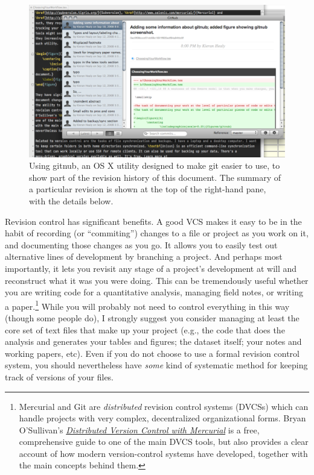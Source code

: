 \documentclass[11pt,article,oneside]{memoir}
\begin{document}
\begin{figure}[h]
	\centering
		\includegraphics[scale=0.33]{figures/gitnub}
	\caption{Using gitnub, an OS X utility designed to make git easier to use, to show part of the revision history of this document. The summary of a particular revision is shown at the top of the right-hand pane, with the details below.}
	\label{fig:gitnub}
\end{figure}

Revision control has significant benefits. A good VCS makes it easy to be in the habit of recording (or ``commiting'') changes to a file or project as you work on it, and documenting those changes as you go. It allows you to easily test out alternative lines of development by branching a project. And perhaps most importantly, it lets you revisit any stage of a project's development at will and reconstruct what it was you were doing. This can be tremendously useful whether you are writing code for a quantitative analysis, managing field notes, or writing a paper.\footnote{Mercurial and Git are \emph{distributed} revision control systems (DVCSs) which can handle projects with very complex, decentralized organizational forms. Bryan O'Sullivan's \href{http://hgbook.red-bean.com/hgbook.pdf}{\emph{Distributed Version Control with Mercurial}} is a free, comprehensive guide to one of the main DVCS tools, but also provides a clear account of how modern version-control systems have developed, together with the main concepts behind them.} While you will probably not need to control everything in this way (though some people do), I strongly suggest you consider managing at least the core set of text files that make up your project (e.g., the code that does the analysis and generates your tables and figures; the dataset itself; your notes and working papers, etc). Even if you do not choose to use a formal revision control system, you should nevertheless have \emph{some} kind of systematic method for keeping track of versions of your files. 
\end{document}
